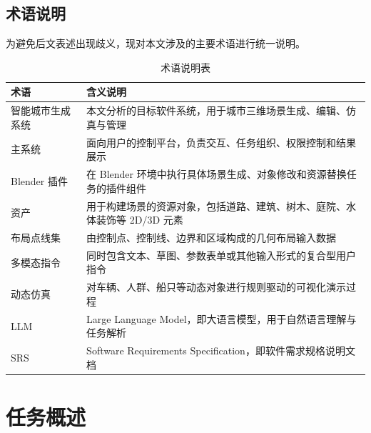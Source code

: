 \documentclass[UTF8,a4paper,10pt]{ctexart}
\begin{document}
\newpage

\subsection{术语说明}
为避免后文表述出现歧义，现对本文涉及的主要术语进行统一说明。

\begin{table}[H]
\centering
\caption{术语说明表}
\begin{tabularx}{\textwidth}{p{3cm} Y}
\toprule
术语 & 含义说明 \\
\midrule
智能城市生成系统 & 本文分析的目标软件系统，用于城市三维场景生成、编辑、仿真与管理 \\
主系统 & 面向用户的控制平台，负责交互、任务组织、权限控制和结果展示 \\
Blender 插件 & 在 Blender 环境中执行具体场景生成、对象修改和资源替换任务的插件组件 \\
资产 & 用于构建场景的资源对象，包括道路、建筑、树木、庭院、水体装饰等 2D/3D 元素 \\
布局点线集 & 由控制点、控制线、边界和区域构成的几何布局输入数据 \\
多模态指令 & 同时包含文本、草图、参数表单或其他输入形式的复合型用户指令 \\
动态仿真 & 对车辆、人群、船只等动态对象进行规则驱动的可视化演示过程 \\
LLM & Large Language Model，即大语言模型，用于自然语言理解与任务解析 \\
SRS & Software Requirements Specification，即软件需求规格说明文档 \\
\bottomrule
\end{tabularx}
\end{table}

\section{任务概述}
\end{document}
